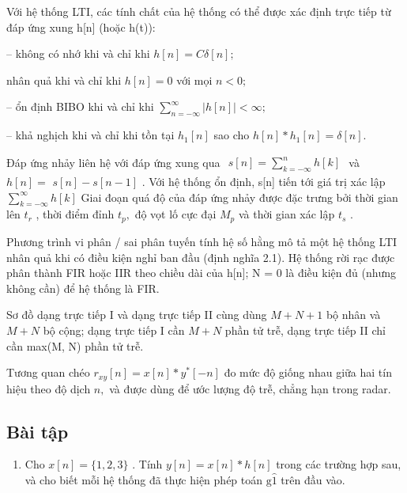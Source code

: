 \documentclass[
  10
]{article}
\providecommand{\tightlist}{%
  \setlength{\itemsep}{0pt}\setlength{\parskip}{0pt}}
\begin{document}
Với hệ thống LTI, các tính chất của hệ thống có thể được xác định trực
tiếp từ đáp ứng xung h{[}n{]} (hoặc h(t)):

-- không có nhớ khi và chỉ khi \(h [ n ] = C \delta [ n ] ;\)

nhân quả khi và chỉ khi \(h [ n ] = 0\) với mọi \(n < 0 ;\)

-- ổn định BIBO khi và chỉ khi
\(\scriptstyle \sum _ { n = - \infty } ^ { \infty } | h [ n ] | < \infty ;\)

-- khả nghịch khi và chỉ khi tồn tại \(h _ { 1 } [ n ]\) sao cho
\(h [ n ] * h _ { 1 } [ n ] = \delta [ n ] .\)

Đáp ứng nhảy liên hệ với đáp ứng xung qua
\(\begin{array} { r } { s [ n ] = \sum _ { k = - \infty } ^ { n } h [ k ] } \end{array}\)
và \(h [ n ] =\) \(s [ n ] - s [ n - 1 ]\) . Với hệ thống ổn định,
s{[}n{]} tiến tới giá trị xác lập
\(\scriptstyle \sum _ { k = - \infty } ^ { \infty } h [ k ]\) Giai đoạn
quá độ của đáp ứng nhảy được đặc trưng bởi thời gian lên \(t _ { r }\) ,
thời điểm đỉnh \(t _ { p } ,\) độ vọt lố cực đại \(M _ { p }\) và thời
gian xác lập \(t _ { s }\) .

Phương trình vi phân / sai phân tuyến tính hệ số hằng mô tả một hệ thống
LTI nhân quả khi có điều kiện nghỉ ban đầu (định nghĩa 2.1). Hệ thống
rời rạc được phân thành FIR hoặc IIR theo chiều dài của h{[}n{]}; N = 0
là điều kiện đủ (nhưng không cần) để hệ thống là FIR.

Sơ đồ dạng trực tiếp I và dạng trực tiếp II cùng dùng \(M + N + 1\) bộ
nhân và \(M + N\) bộ cộng; dạng trực tiếp I cần \(M + N\) phần tử trễ,
dạng trực tiếp II chỉ cần max(M, N) phần tử trễ.

Tương quan chéo \(r _ { x y } [ n ] = x [ n ] * y ^ { * } [ - n ]\) đo
mức độ giống nhau giữa hai tín hiệu theo độ dịch \(n ,\) và được dùng để
ước lượng độ trễ, chẳng hạn trong radar.

\subsection{Bài tập}\label{buxe0i-tux1eadp-1}

\begin{enumerate}
\def\labelenumi{\arabic{enumi}.}
\tightlist
\item
  Cho \(x [ n ] = \{ 1 , 2 , 3 \}\) . Tính
  \(y [ n ] = x [ n ] * h [ n ]\) trong các trường hợp sau, và cho biết
  mỗi hệ thống đã thực hiện phép toán \(\mathrm { g \hat { 1 } }\) trên
  đầu vào.
\end{enumerate}
\end{document}
